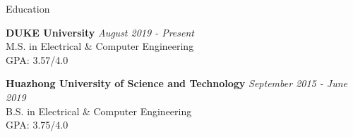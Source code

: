 \documentclass{resume} %
\begin{document}

\begin{rSection}{Education}

{\bf DUKE University} \hfill {\em August 2019 - Present} \\ 
M.S. in Electrical \& Computer Engineering \\
GPA: 3.57/4.0

{\bf Huazhong University of Science and Technology } \hfill {\em September 2015 - June 2019} \\ 
B.S. in Electrical \& Computer Engineering \\
GPA: 3.75/4.0
\end{rSection}

\end{document}
